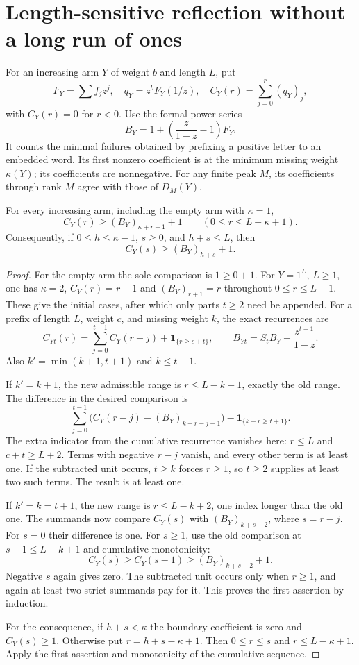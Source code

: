 \section{Length-sensitive reflection without a long run of ones}
For an increasing arm $Y$ of weight $b$ and length $L$, put
\[
 F_Y=\sum f_jz^j,\quad q_Y=z^bF_Y(1/z),\quad
 C_Y(r)=\sum_{j=0}^r(q_Y)_j,
\]
with $C_Y(r)=0$ for $r<0$. Use the formal power series
\[
 B_Y=1+\left(\frac{z}{1-z}-1\right)F_Y.
\]
It counts the minimal failures obtained by prefixing a positive
letter to an embedded word. Its first nonzero coefficient is at
the minimum missing weight $\kappa(Y)$; its coefficients are
nonnegative. For any finite peak $M$, its coefficients through
rank $M$ agree with those of $D_M(Y)$.

\begin{theorem}
For every increasing arm, including the empty arm with $\kappa=1$,
\[
 C_Y(r)\ge (B_Y)_{\kappa+r-1}+1
 \qquad(0\le r\le L-\kappa+1).
\]
Consequently, if $0\le h\le\kappa-1$, $s\ge0$, and $h+s\le L$,
then
\[
 C_Y(s)\ge(B_Y)_{h+s}+1.
\]
\end{theorem}
\begin{proof}
For the empty arm the sole comparison is $1\ge0+1$.
For $Y=1^L$, $L\ge1$, one has $\kappa=2$,
$C_Y(r)=r+1$ and $(B_Y)_{r+1}=r$ throughout $0\le r\le L-1$.
These give the initial cases, after which only parts $t\ge2$
need be appended. For a prefix of length $L$, weight $c$, and
missing weight $k$, the exact recurrences are
\[
 C_{Yt}(r)=\sum_{j=0}^{t-1}C_Y(r-j)+\mathbf1_{\{r\ge c+t\}},
 \qquad B_{Yt}=S_tB_Y+\frac{z^{t+1}}{1-z}.
\]
Also $k'=\min(k+1,t+1)$ and $k\le t+1$.

If $k'=k+1$, the new admissible range is $r\le L-k+1$,
exactly the old range. The difference in the desired comparison is
\[
 \sum_{j=0}^{t-1}
   \bigl(C_Y(r-j)-(B_Y)_{k+r-j-1}\bigr)
   -\mathbf1_{\{k+r\ge t+1\}}.
\]
The extra indicator from the cumulative recurrence vanishes here:
$r\le L$ and $c+t\ge L+2$. Terms with negative $r-j$ vanish,
and every other term is at least one. If the subtracted unit
occurs, $t\ge k$ forces $r\ge1$, so $t\ge2$ supplies at
least two such terms. The result is at least one.

If $k'=k=t+1$, the new range is $r\le L-k+2$, one index
longer than the old one. The summands now compare
$C_Y(s)$ with $(B_Y)_{k+s-2}$, where $s=r-j$.
For $s=0$ their difference is one. For $s\ge1$, use the old
comparison at $s-1\le L-k+1$ and cumulative monotonicity:
\[
 C_Y(s)\ge C_Y(s-1)\ge(B_Y)_{k+s-2}+1.
\]
Negative $s$ again gives zero. The subtracted unit occurs only
when $r\ge1$, and again at least two strict summands pay for it.
This proves the first assertion by induction.

For the consequence, if $h+s<\kappa$ the boundary coefficient
is zero and $C_Y(s)\ge1$. Otherwise put
$r=h+s-\kappa+1$. Then $0\le r\le s$ and
$r\le L-\kappa+1$. Apply the first assertion and monotonicity
of the cumulative sequence.
\end{proof}


